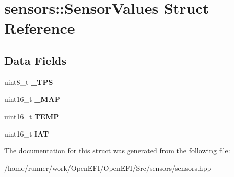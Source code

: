 \hypertarget{structsensors_1_1SensorValues}{}\section{sensors\+:\+:Sensor\+Values Struct Reference}
\label{structsensors_1_1SensorValues}
\subsection*{Data Fields}
\begin{DoxyCompactItemize}
\item 
\mbox{\label{structsensors_1_1SensorValues_a21fb34963c5f7f2054854122a8f6e37f}} 
uint8\+\_\+t {\bfseries \+\_\+\+T\+PS}
\item 
\mbox{\label{structsensors_1_1SensorValues_a71e1e91ef1dfc051f5bc03162c305671}} 
uint16\+\_\+t {\bfseries \+\_\+\+M\+AP}
\item 
\mbox{\label{structsensors_1_1SensorValues_a0fd3e8c256509f2f6d717035cdd7d36f}} 
uint16\+\_\+t {\bfseries T\+E\+MP}
\item 
\mbox{\label{structsensors_1_1SensorValues_aa2ce686fdb118594fb2d1840e5fd26f2}} 
uint16\+\_\+t {\bfseries I\+AT}
\end{DoxyCompactItemize}


The documentation for this struct was generated from the following file\+:\begin{DoxyCompactItemize}
\item 
/home/runner/work/\+Open\+E\+F\+I/\+Open\+E\+F\+I/\+Src/sensors/sensors.\+hpp\end{DoxyCompactItemize}
